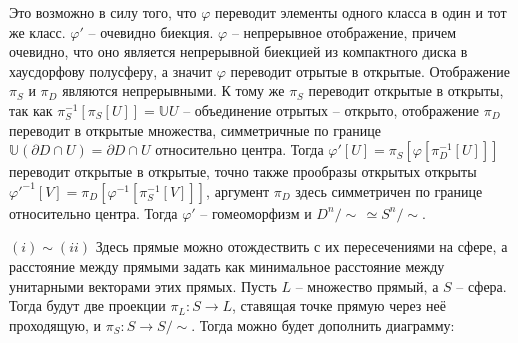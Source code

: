 \documentclass{article}
\begin{document}
\begin{enumerate}
        Это возможно в силу того, что $\varphi$ переводит элементы одного
        класса в один и тот же класс. $\varphi'$ – очевидно биекция. $\varphi$
        – непрерывное отображение, причем очевидно, что оно является
        непрерывной биекцией из компактного диска в хаусдорфову полусферу, а
        значит $\varphi$ переводит отрытые в открытые. Отображение $\pi_S$ и
        $\pi_D$ являются непрерывными. К тому же $\pi_S$ переводит
        открытые в открыты, так как $\pi_S^{-1}[\pi_S[U]] = \mathbb{U}U$ –
        объединение отрытых – открыто, отображение $\pi_D$ переводит в открытые
        множества, симметричные по границе $\mathbb{U}(\partial D\cap U)=\partial
        D\cap U$ относительно центра. Тогда
        $\varphi'[U]=\pi_S[\varphi[\pi_D^{-1}[U]]]$ переводит открытые в
        открытые, точно также прообразы открытых открыты $\varphi'^{-1}[V]=
        \pi_D[\varphi^{-1}[\pi_S^{-1}[V]]]$, аргумент $\pi_D$ здесь симметричен
        по границе относительно центра. Тогда $\varphi'$ – гомеоморфизм и
        $D^n/\!\sim\,\simeq S^n/\!\sim$.

        $(i) \sim (ii)$ Здесь прямые можно отождествить с их пересечениями на
        сфере, а расстояние между прямыми задать как минимальное расстояние
        между унитарными векторами этих прямых. Пусть $L$ – множество прямый, а
        $S$ – сфера. Тогда будут две проекции $\pi_L: S \longrightarrow L$,
        ставящая точке прямую через неё проходящую, и $\pi_S: S \longrightarrow 
        S/\!\sim$. Тогда можно будет дополнить диаграмму:

        \begin{center}
        \end{center}


\end{enumerate}
\end{document}
